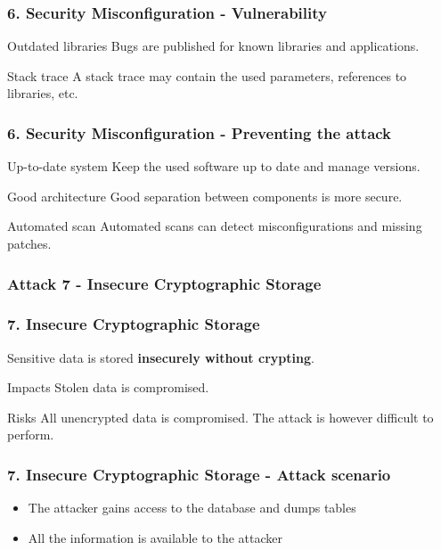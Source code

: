 \begin{frame}
\frametitle{6. Security Misconfiguration - Vulnerability}
\begin{block}{Outdated libraries}
Bugs are published for known libraries and applications.
\end{block}
\begin{exampleblock}{Stack trace}
A stack trace may contain the used parameters, references to libraries, etc.
\end{exampleblock}
\end{frame}

\begin{frame}
\frametitle{6. Security Misconfiguration - Preventing the attack}
\begin{block}{Up-to-date system}
Keep the used software up to date and manage versions.
\end{block}
\begin{block}{Good architecture}
Good separation between components is more secure.
\end{block}
\begin{block}{Automated scan}
Automated scans can detect misconfigurations and missing patches.
\end{block}
\end{frame}

\subsubsection{Attack 7 - Insecure Cryptographic Storage}

\begin{frame}
\frametitle{7. Insecure Cryptographic Storage}
Sensitive data is stored \textbf{insecurely without crypting}.
\begin{block}{Impacts}
Stolen data is compromised.
\end{block}
\begin{block}{Risks}
All unencrypted \alert{data} is compromised.
The attack is however difficult to perform.
\end{block}
\end{frame}

\begin{frame}
\frametitle{7. Insecure Cryptographic Storage - Attack scenario}
\begin{itemize}
\item The attacker gains access to the database and dumps tables
\item All the information is available to the attacker
\end{itemize}
\end{frame}

